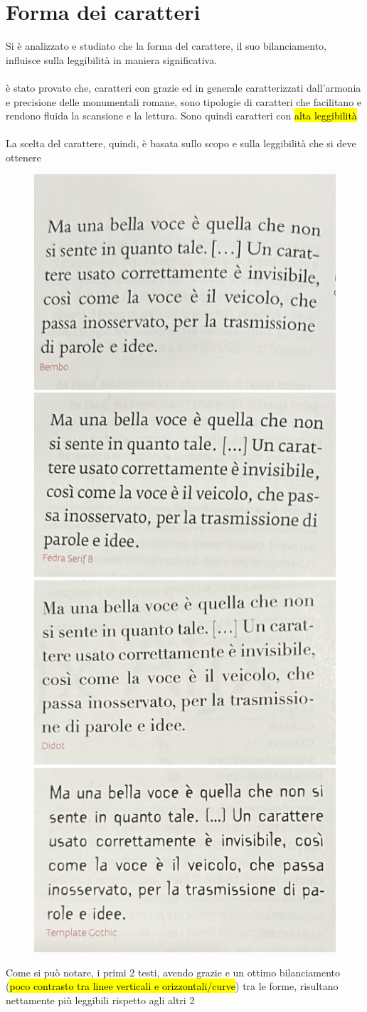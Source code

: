 \section{Forma dei caratteri}
Si è analizzato e studiato che la forma del carattere, il suo bilanciamento, influisce sulla leggibilità in maniera significativa.
\\\\
è stato provato che, caratteri con grazie ed in generale caratterizzati dall'armonia e precisione delle monumentali romane, sono tipologie di caratteri che facilitano e rendono fluida la scansione e la lettura. Sono quindi caratteri con \hl{alta leggibilità}
\\\\
La scelta del carattere, quindi, è basata sullo scopo e sulla leggibilità che si deve ottenere
\begin{figure}[H]
    \centering
    \includegraphics[width=0.2\linewidth]{lzione_4/imgs/f.jpg}
     \includegraphics[width=0.2\linewidth]{lzione_4/imgs/f2.jpg}
      \includegraphics[width=0.2\linewidth]{lzione_4/imgs/f3.jpg} \includegraphics[width=0.2\linewidth]{lzione_4/imgs/f4.jpg}
\end{figure}
Come si può notare, i primi 2 testi, avendo grazie e un ottimo bilanciamento (\hl{poco contrasto tra linee verticali e orizzontali/curve}) tra le forme, risultano nettamente più leggibili rispetto agli altri 2


